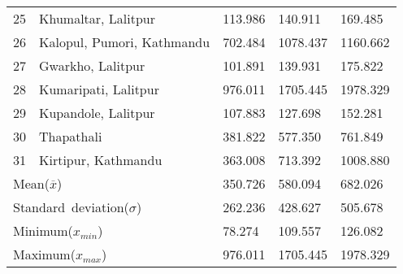 \begin{tabularx}{\textwidth}{ | l | p{} | X | X | X | }
 25 & Khumaltar, Lalitpur  & 113.986 & 140.911 & 169.485 \\
 26 & Kalopul, Pumori, Kathmandu & 702.484 & 1078.437 & 1160.662 \\
 27 & Gwarkho, Lalitpur & 101.891 & 139.931 & 175.822 \\
 28 & Kumaripati, Lalitpur & 976.011 & 1705.445 & 1978.329 \\
 29 & Kupandole, Lalitpur & 107.883 & 127.698 & 152.281 \\
 30 & Thapathali & 381.822 & 577.350 & 761.849 \\
 31 & Kirtipur, Kathmandu & 363.008 & 713.392 & 1008.880 \\
\hline
\multicolumn{2}{|X|}{\mbox{Mean($\overline{x}$)}} & 350.726 & 580.094 & 682.026 \\
\multicolumn{2}{|X|}{\mbox{Standard deviation($\sigma$)}} & 262.236 & 428.627 & 505.678 \\
\multicolumn{2}{|X|}{\mbox{Minimum($x_{min}$)}} & 78.274 & 109.557 & 126.082 \\
\multicolumn{2}{|X|}{\mbox{Maximum($x_{max}$)}} & 976.011 & 1705.445 & 1978.329 \\
\hline
\end{tabularx}
